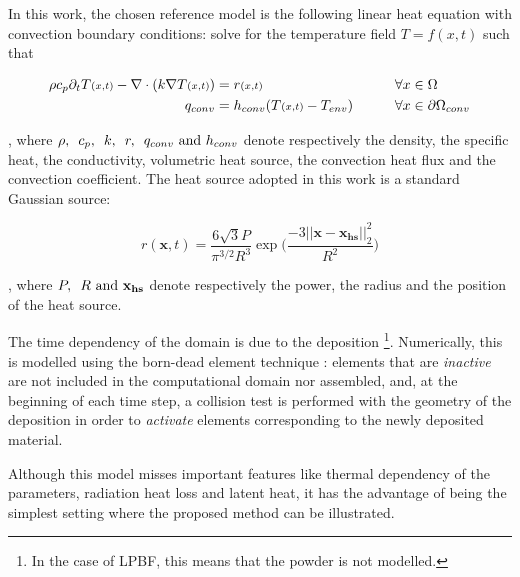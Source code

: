 In this work, the chosen reference model is
the following linear heat equation with convection
boundary conditions: solve for the temperature
field $T = f(x,t)$ such that

\begin{align}
  \rho c_p \partial_t T{\scriptstyle(x,t)} - \nabla \cdot (k \nabla T{\scriptstyle(x,t)}) &= r{\scriptstyle(x,t)}
  \qquad &\forall x &\in \Omega \label{eq:refheateq}\\
  q_{conv} &= h_{conv} ( T{\scriptstyle(x,t)} - T_{env} ) \qquad & \forall x &\in \partial \Omega {}_{conv}\notag
\end{align}

, where $\rho, \enskip c_p, \enskip k, \enskip  r, \enskip q_{conv} \textrm{ and } h_{conv}$
denote respectively
the density, the specific heat, the conductivity, volumetric
heat source, the convection heat flux and the convection coefficient.
The heat source adopted in this work is a standard Gaussian source:

\begin{equation}\label{eq:heatsource}
  r(\mathbf{x}, t) = \frac{6 \sqrt{3} P}{ \pi^{3/2} R^3}
  \exp\bigg( \frac{-3||\mathbf{x} - \mathbf{x_{hs}}||_2^2}{R^2}\bigg)
\end{equation}

, where $P, \enskip R \textrm{ and } \mathbf{x_{hs}}$
denote respectively the power, the radius and the position
of the heat source.\par

The time dependency of the domain is due to
the deposition
\footnote{ In the case of LPBF, this means that the powder is not modelled. }.
Numerically, this is modelled using  the born-dead element
technique \citep{Chiumenti2010}:
elements that are \textit{inactive} are not included in the
computational domain nor assembled,
and, at the beginning of each time step, a collision test
is performed with the geometry of the deposition
in order to \textit{activate} elements corresponding to
the newly deposited material.\par

Although this model misses important features like
thermal dependency of the parameters, radiation heat loss and
latent heat\citep{VanElsen2007, Hodge2021},
it has the advantage of being the simplest setting
where the proposed method can be illustrated.\par
